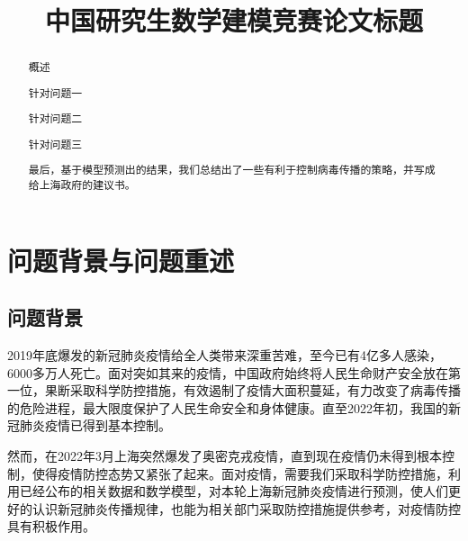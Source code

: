 \documentclass[bwprint]{gmcmthesis}
\title{中国研究生数学建模竞赛论文标题}
\numberwithin{figure}{section}
\begin{document}
 \maketitle
 \begin{abstract}
概述
\par 针对问题一
\par 针对问题二
\par 针对问题三
\par 最后，基于模型预测出的结果，我们总结出了一些有利于控制病毒传播的策略，并写成给上海政府的建议书。






\end{abstract}


\tableofcontents

\section{问题背景与问题重述}
\subsection{问题背景}
2019年底爆发的新冠肺炎疫情给全人类带来深重苦难，至今已有4亿多人感染，6000多万人死亡。面对突如其来的疫情，中国政府始终将人民生命财产安全放在第一位，果断采取科学防控措施，有效遏制了疫情大面积蔓延，有力改变了病毒传播的危险进程，最大限度保护了人民生命安全和身体健康。直至2022年初，我国的新冠肺炎疫情已得到基本控制。
\par 然而，在2022年3月上海突然爆发了奥密克戎疫情，直到现在疫情仍未得到根本控制，使得疫情防控态势又紧张了起来。面对疫情，需要我们采取科学防控措施，利用已经公布的相关数据和数学模型，对本轮上海新冠肺炎疫情进行预测，使人们更好的认识新冠肺炎传播规律，也能为相关部门采取防控措施提供参考，对疫情防控具有积极作用。
\end{document}

